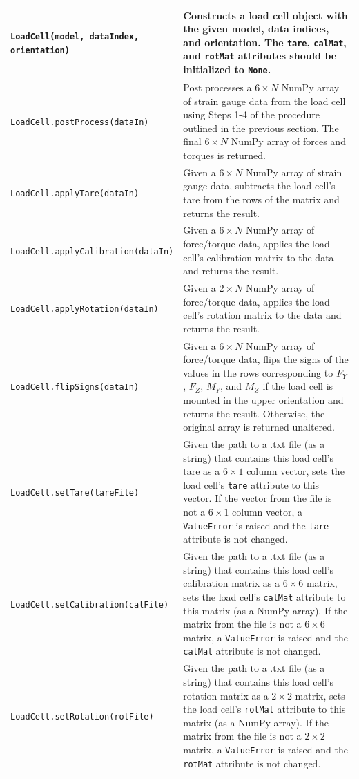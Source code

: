 \documentclass{homework}
\begin{document}
\begin{tabular}{p{0.45\linewidth} | p{0.6\linewidth}} 
    \hline
    \texttt{LoadCell(model, dataIndex, orientation)} & Constructs a load cell object with the given model, data indices, and orientation. The \texttt{tare}, \texttt{calMat}, and \texttt{rotMat} attributes should be initialized to \texttt{None}. \\ \hline
    \texttt{LoadCell.postProcess(dataIn)} & Post processes a $6\!\times\!N$ NumPy array of strain gauge data from the load cell using Steps 1-4 of the procedure outlined in the previous section. The final $6\!\times\!N$ NumPy array of forces and torques is returned. \\ \hline
    \texttt{LoadCell.applyTare(dataIn)} & Given a $6\!\times\!N$ NumPy array of strain gauge data, subtracts the load cell's tare from the rows of the matrix and returns the result. \\ \hline
    \texttt{LoadCell.applyCalibration(dataIn)} & Given a $6\!\times\!N$ NumPy array of force/torque data, applies the load cell's calibration matrix to the data and returns the result. \\ \hline
    \texttt{LoadCell.applyRotation(dataIn)} & Given a $2\!\times\!N$ NumPy array of force/torque data, applies the load cell's rotation matrix to the data and returns the result. \\ \hline
    \texttt{LoadCell.flipSigns(dataIn)} & Given a $6\!\times\!N$ NumPy array of force/torque data, flips the signs of the values in the rows corresponding to $F_Y$, $F_Z$, $M_Y$, and $M_Z$ if the load cell is mounted in the upper orientation and returns the result. Otherwise, the original array is returned unaltered. \\ \hline
    \texttt{LoadCell.setTare(tareFile)} & Given the path to a .txt file (as a string) that contains this load cell's tare as a $6\!\times\!1$ column vector, sets the load cell's \texttt{tare} attribute to this vector. If the vector from the file is not a $6\!\times\!1$ column vector, a \texttt{ValueError} is raised and the \texttt{tare} attribute is not changed.  \\ \hline
    \texttt{LoadCell.setCalibration(calFile)} & Given the path to a .txt file (as a string) that contains this load cell's calibration matrix as a $6\!\times\!6$ matrix, sets the load cell's \texttt{calMat} attribute to this matrix (as a NumPy array). If the matrix from the file is not a $6\!\times\!6$ matrix, a \texttt{ValueError} is raised and the \texttt{calMat} attribute is not changed. \\ \hline
    \texttt{LoadCell.setRotation(rotFile)} & Given the path to a .txt file (as a string) that contains this load cell's rotation matrix as a $2\!\times\!2$ matrix, sets the load cell's \texttt{rotMat} attribute to this matrix (as a NumPy array). If the matrix from the file is not a $2\!\times\!2$ matrix, a \texttt{ValueError} is raised and the \texttt{rotMat} attribute is not changed. \\ \hline
\end{tabular}
\end{document}
